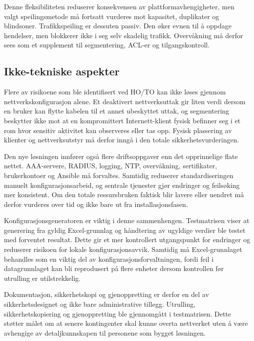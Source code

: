 Denne fleksibiliteten reduserer konsekvensen av plattformavhengigheter, men valgt speilingsmetode må fortsatt vurderes mot kapasitet, duplikater og blindsoner. Trafikkspeiling er dessuten passiv. Den øker evnen til å oppdage hendelser, men blokkerer ikke i seg selv skadelig trafikk. Overvåkning må derfor sees som et supplement til segmentering, ACL-er og tilgangskontroll.

\subsection{Ikke-tekniske aspekter}

Flere av risikoene som ble identifisert ved HO/TO kan ikke løses gjennom nettverkskonfigurasjon alene. Et deaktivert nettverksuttak gir liten verdi dersom en bruker kan flytte kabelen til et annet ubeskyttet uttak, og segmentering beskytter ikke mot at en kompromittert Internett-klient fysisk befinner seg i et rom hvor sensitiv aktivitet kan observeres eller tas opp. Fysisk plassering av klienter og nettverksutstyr må derfor inngå i den totale sikkerhetsvurderingen.

Den nye løsningen innfører også flere driftsoppgaver enn det opprinnelige flate nettet. AAA-servere, RADIUS, logging, NTP, overvåkning, sertifikater, brukerkontoer og Ansible må forvaltes. Samtidig reduserer standardiseringen manuelt konfigurasjonsarbeid, og sentrale tjenester gjør endringer og feilsøking mer konsistent. Om den totale ressursbruken faktisk blir lavere eller uendret må derfor vurderes over tid og ikke bare ut fra installasjonsfasen.

Konfigurasjonsgeneratoren er viktig i denne sammenhengen. Testmatrisen viser at generering fra gyldig Excel-grunnlag og håndtering av ugyldige verdier ble testet med forventet resultat. Dette gir et mer kontrollert utgangspunkt for endringer og reduserer risikoen for lokale konfigurasjonsavvik. Samtidig må Excel-grunnlaget behandles som en viktig del av konfigurasjonsforvaltningen, fordi feil i datagrunnlaget kan bli reprodusert på flere enheter dersom kontrollen før utrulling er utilstrekkelig.

Dokumentasjon, sikkerhetskopi og gjenoppretting er derfor en del av sikkerhetsdesignet og ikke bare administrative tillegg. Utrulling, sikkerhetskopiering og gjenoppretting ble gjennomgått i testmatrisen. Dette støtter målet om at senere kontingenter skal kunne overta nettverket uten å være avhengige av detaljkunnskapen til personene som bygget løsningen.

